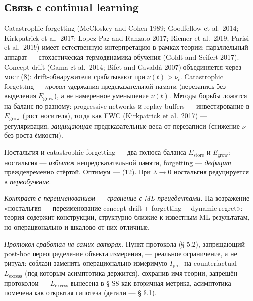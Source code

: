 \documentclass[pdflatex,sn-mathphys-ay]{sn-jnl}
\begin{document}
\subsection{Связь с continual learning}\label{ux441ux432ux44fux437ux44c-ux441-continual-learning}



Catastrophic forgetting (McCloskey and Cohen 1989; Goodfellow et al.~2014; Kirkpatrick et al.~2017; Lopez-Paz and Ranzato 2017; Riemer et al.~2019; Parisi et al.~2019) имеет естественную интерпретацию в рамках теории; параллельный аппарат --- стохастическая термодинамика обучения (Goldt and Seifert 2017). Concept drift (Gama et al.~2014; Bifet and Gavaldà 2007) объединяется через мост (8): drift-обнаружители срабатывают при \(\nu(t) > \nu_c\). Catastrophic forgetting --- \emph{провал} удержания предсказательной памяти (перезапись без выделения \(E_{\text{grow}}\)), а не намеренное уменьшение \(\nu(t)\). Методы борьбы ложатся на баланс по-разному: progressive networks и replay buffers --- инвестирование в \(E_{\text{grow}}\) (рост носителя), тогда как EWC (Kirkpatrick et al.~2017) --- регуляризация, \emph{защищающая} предсказательные веса от перезаписи (снижение \(\nu\) без роста ёмкости).



Ностальгия и catastrophic forgetting --- два полюса баланса \(\dot{E}_{\text{store}}\) и \(\dot{E}_{\text{grow}}\): ностальгия --- \emph{избыток} непредсказательной памяти, forgetting --- \emph{дефицит} преждевременно стёртой. Оптимум --- (12). При \(\lambda \to 0\) ностальгия редуцируется в \emph{переобучение}.



\emph{Контраст с переименованием --- сравнение с ML-прецедентами.} На возражение «ностальгия --- переименование concept drift + forgetting + dynamic regret»: теория содержит конструкции, структурно близкие к известным ML-результатам, но операционально и шкалово от них отличные.



\emph{Протокол сработал на самих авторах.} Пункт протокола (§ 5.2), запрещающий post-hoc переопределение объекта измерения, --- реальное ограничение, а не ритуал: соблазн заменить операционально измеримую \(I_{\text{pred}}\) на counterfactual \(L_{\text{excess}}\) (под которым асимптотика держится), сохранив имя теории, запрещён протоколом --- \(L_{\text{excess}}\) вынесена в § S8 как вторичная метрика, асимптотика помечена как открытая гипотеза (детали --- § 8.1).
\end{document}
